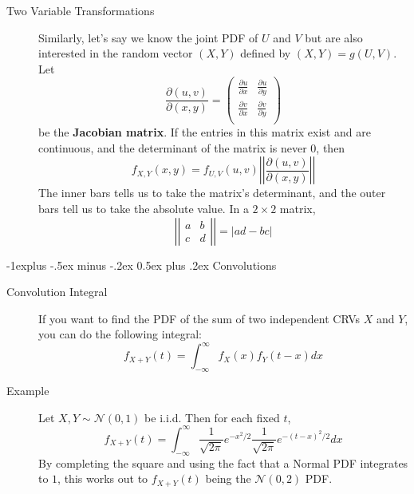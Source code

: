 \documentclass[6pt, landscape]{article}
\makeatletter
\renewcommand{\subsection}{\@startsection{subsection}{2}{0mm}%
                                {-1explus -.5ex minus -.2ex}%
                                {0.5ex plus .2ex}%
                                {\small\bfseries}}
\renewcommand{\N}{\mathcal{N}}
\makeatother
\begin{document}
\begin{multicols}{3}
\begin{description}
                \item[Two Variable Transformations] Similarly, let's say we know the joint PDF of $U$ and $V$ but are also interested in the random vector $(X, Y)$ defined by $(X, Y) = g(U, V)$. Let
                      $$  \frac{\partial (u,v)}{\partial (x,y)}  = \begin{pmatrix}
                                      \frac{\partial u}{\partial x} & \frac{\partial u}{\partial y} \\
                                      \frac{\partial v}{\partial x} & \frac{\partial v}{\partial y} \\
                              \end{pmatrix}$$
                      be the \textbf{Jacobian matrix}. If the entries in this matrix exist and are continuous, and the determinant of the matrix is never $0$, then
                      \[f_{X,Y}(x, y) = f_{U,V}(u,v) \left|\left|   \frac{\partial (u,v)}{\partial (x,y)}\right| \right| \]
                      The inner bars tells us to take the matrix's determinant, and the outer bars tell us to take the absolute value.  In a $2 \times 2$ matrix,
                      \[ \left| \left|
                              \begin{array}{ccc}
                                      a & b \\
                                      c & d
                              \end{array}
                              \right| \right| = |ad - bc|\]

        \end{description}

        \label{convolutions}
        \subsection{Convolutions}
        \begin{description}
                \item[Convolution Integral] If you want to find the PDF of the sum of two independent CRVs $X$ and $Y$, you can do the following integral:
                      \[f_{X+Y}(t)=\int_{-\infty}^\infty f_X(x)f_Y(t-x)dx\]
                \item[Example] Let $X,Y \sim \N(0,1)$ be i.i.d. Then for each fixed $t$,\[f_{X+Y}(t)=\int_{-\infty}^\infty \frac{1}{\sqrt{2\pi}}e^{-x^2/2} \frac{1}{\sqrt{2\pi}}e^{-(t-x)^2/2} dx\]
                      By completing the square and using the fact that a Normal PDF integrates to $1$, this works out to $f_{X+Y}(t)$ being the $\N(0,2)$ PDF.
        \end{description}


\end{multicols}
\end{document}
